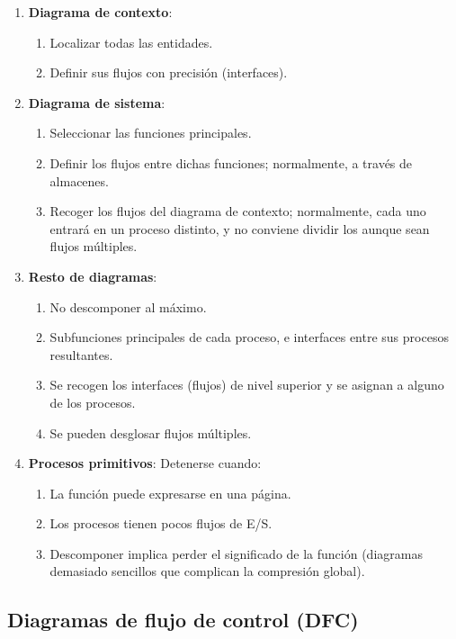 \begin{enumerate}
    \item \textbf{Diagrama de contexto}:
    \begin{enumerate}
        \item Localizar todas las entidades.
        \item Definir sus flujos con precisión (interfaces).
    \end{enumerate}
    \item \textbf{Diagrama de sistema}:
    \begin{enumerate}
        \item Seleccionar las funciones principales.
        \item Definir los flujos entre dichas funciones; normalmente, a través de almacenes.
        \item Recoger los flujos del diagrama de contexto; normalmente, cada uno entrará en un proceso distinto, y no conviene dividir los aunque sean flujos múltiples.
    \end{enumerate}
    \item \textbf{Resto de diagramas}:
    \begin{enumerate}
        \item No descomponer al máximo.
        \item Subfunciones principales de cada proceso, e interfaces entre sus procesos resultantes.
        \item Se recogen los interfaces (flujos) de nivel superior y se asignan a alguno de los procesos.
        \item Se pueden desglosar flujos múltiples.
    \end{enumerate}
    \item \textbf{Procesos primitivos}:
    Detenerse cuando:
    \begin{enumerate}
        \item La función puede expresarse en una página.
        \item Los procesos tienen pocos flujos de E/S.
        \item Descomponer implica perder el significado de la función (diagramas demasiado sencillos que complican la compresión global).
    \end{enumerate}
\end{enumerate}


\subsection{Diagramas de flujo de control (DFC)}

